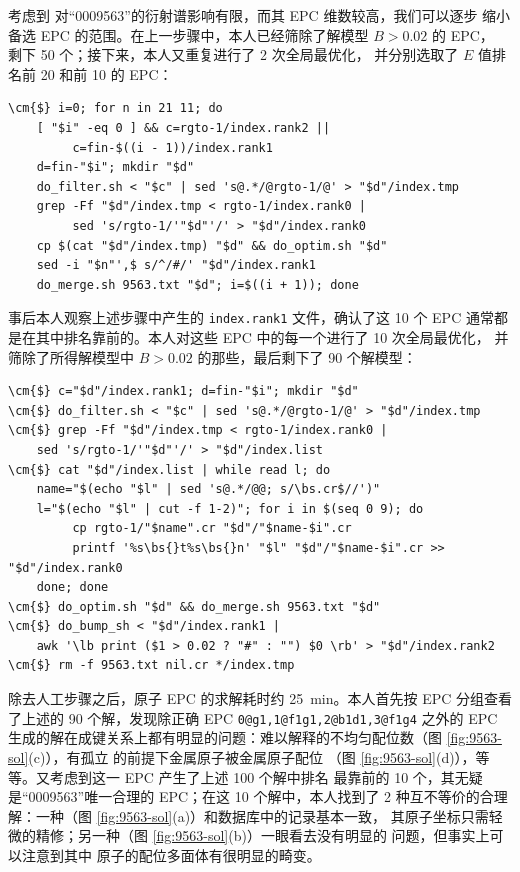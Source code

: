 考虑到  对“0009563”的衍射谱影响有限，而其 EPC 维数较高，我们可以逐步
缩小备选 EPC 的范围。在上一步骤中，本人已经筛除了解模型 $B > 0.02$ 的 EPC，
剩下 50 个；接下来，本人又重复进行了 2 次全局最优化，
并分别选取了 $E$ 值排名前 20 和前 10 的 EPC：
\begin{Verbatim}
\cm{$} i=0; for n in 21 11; do
	[ "$i" -eq 0 ] && c=rgto-1/index.rank2 ||
	     c=fin-$((i - 1))/index.rank1
	d=fin-"$i"; mkdir "$d"
	do_filter.sh < "$c" | sed 's@.*/@rgto-1/@' > "$d"/index.tmp
	grep -Ff "$d"/index.tmp < rgto-1/index.rank0 |
	     sed 's/rgto-1/'"$d"'/' > "$d"/index.rank0
	cp $(cat "$d"/index.tmp) "$d" && do_optim.sh "$d"
	sed -i "$n"',$ s/^/#/' "$d"/index.rank1
	do_merge.sh 9563.txt "$d"; i=$((i + 1)); done
\end{Verbatim}
事后本人观察上述步骤中产生的 \verb|index.rank1| 文件，确认了这 10 个 EPC
通常都是在其中排名靠前的。本人对这些 EPC 中的每一个进行了 10 次全局最优化，
并筛除了所得解模型中 $B > 0.02$ 的那些，最后剩下了 90 个解模型：
\begin{Verbatim}
\cm{$} c="$d"/index.rank1; d=fin-"$i"; mkdir "$d"
\cm{$} do_filter.sh < "$c" | sed 's@.*/@rgto-1/@' > "$d"/index.tmp
\cm{$} grep -Ff "$d"/index.tmp < rgto-1/index.rank0 |
	sed 's/rgto-1/'"$d"'/' > "$d"/index.list
\cm{$} cat "$d"/index.list | while read l; do
	name="$(echo "$l" | sed 's@.*/@@; s/\bs.cr$//')"
	l="$(echo "$l" | cut -f 1-2)"; for i in $(seq 0 9); do
	     cp rgto-1/"$name".cr "$d"/"$name-$i".cr
	     printf '%s\bs{}t%s\bs{}n' "$l" "$d"/"$name-$i".cr >> "$d"/index.rank0
	done; done
\cm{$} do_optim.sh "$d" && do_merge.sh 9563.txt "$d"
\cm{$} do_bump_sh < "$d"/index.rank1 |
	awk '\lb print ($1 > 0.02 ? "#" : "") $0 \rb' > "$d"/index.rank2
\cm{$} rm -f 9563.txt nil.cr */index.tmp
\end{Verbatim}
除去人工步骤之后，原子 EPC 的求解耗时约 \SI{25}{\minute}。本人首先按
EPC 分组查看了上述的 90 个解，发现除正确 EPC \verb|0@g1,1@f1g1,2@b1d1,3@f1g4|
之外的 EPC 生成的解在成键关系上都有明显的问题：难以解释的不均匀配位数（图
\ref{fig:9563-sol}(c)），有孤立  的前提下金属原子被金属原子配位
（图 \ref{fig:9563-sol}(d)），等等。又考虑到这一 EPC 产生了上述 100 个解中排名
最靠前的 10 个，其无疑是“0009563”唯一合理的 EPC；在这 10 个解中，本人找到了 2
种互不等价的合理解：一种（图 \ref{fig:9563-sol}(a)）和数据库中的记录基本一致，
其原子坐标只需轻微的精修；另一种（图 \ref{fig:9563-sol}(b)）一眼看去没有明显的
问题，但事实上可以注意到其中  原子的配位多面体有很明显的畸变。

